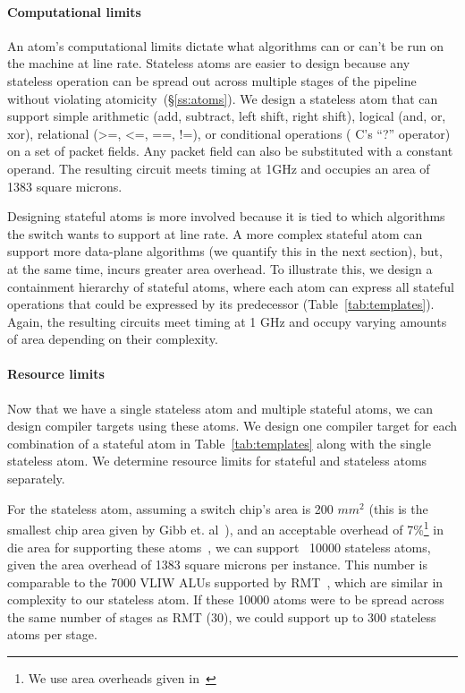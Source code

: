 \paragraph{Computational limits}
An atom's computational limits dictate what algorithms can or can't be run on
the \absmachine machine at line rate. Stateless atoms are easier to design
because any stateless operation can be spread out across multiple stages of the
pipeline without violating atomicity~(\S\ref{ss:atoms}). We design a stateless
atom that can support simple arithmetic (add, subtract, left shift, right
shift), logical (and, or, xor), relational (>=, <=, ==, !=), or conditional
operations ( C's ``?'' operator) on a set of packet fields. Any packet field
can also be substituted with a constant operand. The resulting circuit meets
timing at 1GHz and occupies an area of 1383 square microns.

Designing stateful atoms is more involved because it is tied to which
algorithms the switch wants to support at line rate. A more complex stateful
atom can support more data-plane algorithms (we quantify this in the next
section), but, at the same time, incurs greater area overhead. To illustrate
this, we design a containment hierarchy of stateful atoms, where each atom can
express all stateful operations that could be expressed by its predecessor
(Table~\ref{tab:templates}). Again, the resulting circuits meet timing at 1 GHz
and occupy varying amounts of area depending on their complexity.

\paragraph{Resource limits}
Now that we have a single stateless atom and multiple stateful atoms, we can
design compiler targets using these atoms.  We design one compiler target for
each combination of a stateful atom in Table~\ref{tab:templates} along with the
single stateless atom. We determine resource limits for stateful and stateless
atoms separately.

For the stateless atom, assuming a switch chip's area is 200 $mm^2$ (this is
the smallest chip area given by Gibb et. al~\cite{gibb_parsing}), and an
acceptable overhead of 7\%\footnote{We use area overheads given in~\cite{rmt}}
in die area for supporting these atoms~\cite{rmt}, we can support ~10000
stateless atoms, given the area overhead of 1383 square microns per instance.
This number is comparable to the 7000 VLIW ALUs supported by RMT~\cite{rmt},
which are similar in complexity to our stateless atom. If these 10000 atoms
were to be spread across the same number of stages as RMT (30), we could
support up to 300 stateless atoms per stage.

